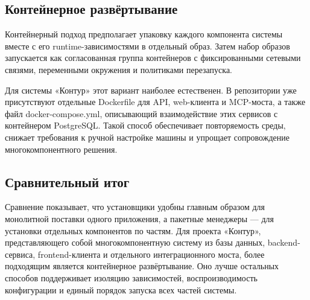 \textheadingsep
\subsection{Контейнерное развёртывание}
\headingtextsep

Контейнерный подход предполагает упаковку каждого компонента системы вместе с его runtime-зависимостями в отдельный образ. Затем набор образов запускается как согласованная группа контейнеров с фиксированными сетевыми связями, переменными окружения и политиками перезапуска.

Для системы «Контур» этот вариант наиболее естественен. В репозитории уже присутствуют отдельные Dockerfile для API, web-клиента и MCP-моста, а также файл docker-compose.yml, описывающий взаимодействие этих сервисов с контейнером PostgreSQL. Такой способ обеспечивает повторяемость среды, снижает требования к ручной настройке машины и упрощает сопровождение многокомпонентного решения.

\textheadingsep
\subsection{Сравнительный итог}
\headingtextsep

Сравнение показывает, что установщики удобны главным образом для монолитной поставки одного приложения, а пакетные менеджеры --- для установки отдельных компонентов по частям. Для проекта «Контур», представляющего собой многокомпонентную систему из базы данных, backend-сервиса, frontend-клиента и отдельного интеграционного моста, более подходящим является контейнерное развёртывание. Оно лучше остальных способов поддерживает изоляцию зависимостей, воспроизводимость конфигурации и единый порядок запуска всех частей системы.

